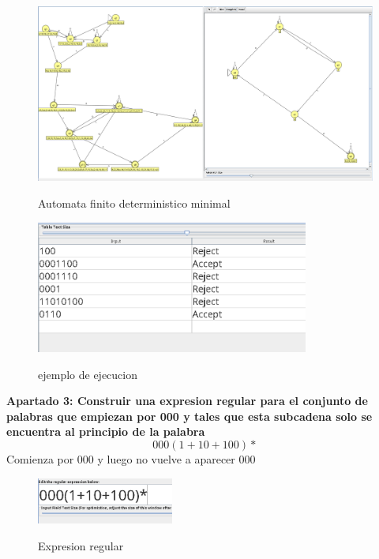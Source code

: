 \documentclass{article}
\begin{document}
        \begin{figure}[!h]
            \centering
            \includegraphics[width=1.2\textwidth]{./Imagenes/image28.png}
            \label{fig:label4}
            \caption{Automata finito deterministico minimal}
        \end{figure}

        \newpage
        \begin{figure}[!h]
            \centering
            \includegraphics[width=0.8\textwidth]{./Imagenes/image29.png}
            \label{fig:label4}
            \caption{ejemplo de ejecucion}
        \end{figure}

        \textbf{Apartado 3: Construir una expresion regular para el conjunto de palabras que empiezan por 000 y tales que esta subcadena solo se encuentra al principio de la palabra}
        $$ 000(1+10+100)*$$
        Comienza por 000 y luego no vuelve a aparecer 000
        
        \begin{figure}[!h]
            \centering
            \includegraphics[width=0.4\textwidth]{./Imagenes/image20.png}
            \label{fig:label4}
            \caption{Expresion regular}
        \end{figure}
\end{document}
